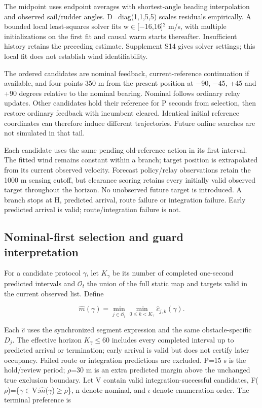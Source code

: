 \documentclass[conference]{IEEEtran}
\begin{document}
The midpoint uses endpoint averages with shortest-angle heading interpolation and observed sail/rudder angles. D=diag(1,1,5,5) scales residuals empirically. A bounded local least-squares solver fits w\ensuremath{\in}[\ensuremath{-}16,16]\ensuremath{^2} m/s, with multiple initializations on the first fit and causal warm starts thereafter. Insufficient history retains the preceding estimate. Supplement S14 gives solver settings; this local fit does not establish wind identifiability.

The ordered candidates are nominal feedback, current-reference continuation if available, and four points 350 m from the present position at \ensuremath{-}90, \ensuremath{-}45, +45 and +90 degrees relative to the nominal bearing. Nominal follows ordinary relay updates. Other candidates hold their reference for P seconds from selection, then restore ordinary feedback with incumbent cleared. Identical initial reference coordinates can therefore induce different trajectories. Future online searches are not simulated in that tail.

Each candidate uses the same pending old-reference action in its first interval. The fitted wind remains constant within a branch; target position is extrapolated from its current observed velocity. Forecast policy/relay observations retain the 1000 m sensing cutoff, but clearance scoring retains every initially valid observed target throughout the horizon. No unobserved future target is introduced. A branch stops at H, predicted arrival, route failure or integration failure. Early predicted arrival is valid; route/integration failure is not.

\subsection{Nominal-first selection and guard interpretation}

For a candidate protocol \ensuremath{\gamma}, let $K_\gamma$ be its number of completed one-second predicted intervals and $\mathcal O_t$ the union of the full static map and targets valid in the current observed list. Define

\begin{equation}\label{eq:3}
\hat m(\gamma)=\min_{j\in\mathcal O_t}\min_{0\le k<K_\gamma}\hat c_{j,k}(\gamma).
\end{equation}

Each $\hat c$ uses the synchronized segment expression and the same obstacle-specific $D_j$. The effective horizon $K_\gamma$\ensuremath{\le}60 includes every completed interval up to predicted arrival or termination; early arrival is valid but does not certify later occupancy. Failed route or integration predictions are excluded. P=15 s is the hold/review period; \ensuremath{\rho}=30 m is an extra predicted margin above the unchanged true exclusion boundary. Let V contain valid integration-successful candidates, F(\ensuremath{\rho})=\{\ensuremath{\gamma}\ensuremath{\in}V:$\hat m$(\ensuremath{\gamma})\ensuremath{\ge}\ensuremath{\rho}\}, n denote nominal, and \ensuremath{\iota} denote enumeration order. The terminal preference is
\end{document}
